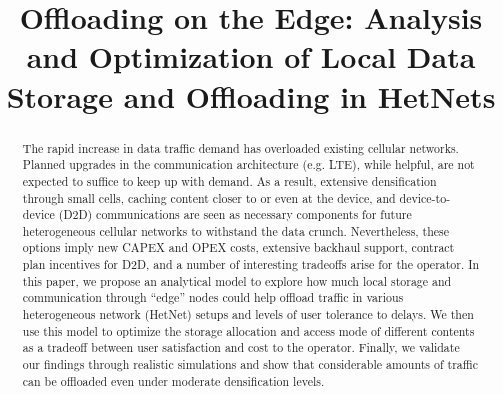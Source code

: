 \documentclass[10pt,conference,letterpaper]{IEEEtran}
\begin{document}
\title{Offloading on the Edge: Analysis and Optimization of Local Data Storage and Offloading in HetNets}
\author{
\and
 \and
 }
\maketitle


\begin{abstract}
The rapid increase in data traffic demand has overloaded existing cellular networks. Planned upgrades in the communication architecture (e.g. LTE), while helpful, are not expected to suffice to keep up with demand. As a result, extensive densification through small cells, caching content closer to or even at the device, and device-to-device (D2D) communications are seen as necessary components for future heterogeneous cellular networks to withstand the data crunch. Nevertheless, these options imply new CAPEX and OPEX costs, extensive backhaul support, contract plan incentives for D2D, and a number of interesting tradeoffs arise for the operator. 
In this paper, we propose an analytical model to explore how much local storage and communication through ``edge'' nodes could help offload traffic in various heterogeneous network (HetNet) setups and levels of user tolerance to delays. We then use this model to optimize the storage allocation and access mode of different contents as a tradeoff between user satisfaction and cost to the operator. Finally, we validate our findings through realistic simulations and show that considerable amounts of traffic can be offloaded even under moderate densification levels.
\end{abstract}
\end{document}
